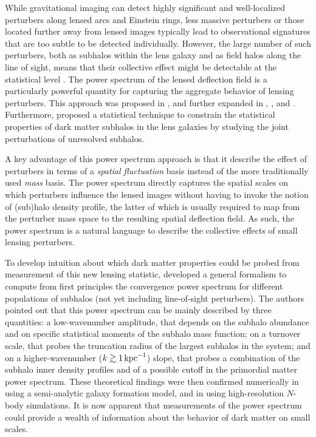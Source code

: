 \documentclass[modern,linenumbers]{aastex62}
\begin{document}
While gravitational imaging can detect highly significant and well-localized perturbers along lensed arcs and Einstein rings, less massive perturbers or those located further away from lensed images typically lead to observational signatures that are too subtle to be detected individually. However, the large number of such perturbers, both as subhalos within the lens galaxy and as field halos along the line of sight, means that their collective effect might be detectable at the statistical level \citep[\eg,][]{Birrer2017}. The power spectrum of the lensed deflection field is a particularly powerful quantity for capturing the aggregate behavior of lensing perturbers. This approach was proposed in \cite{Hezaveh_2014}, and further expanded in \cite{Rivero:2017mao}, \cite{Chatterjee_2017}, and \cite{Cyr-Racine:2018htu}. 
Furthermore, \cite{Daylan:2017kfh} proposed a statistical technique to constrain the statistical properties of dark matter subhalos in the lens galaxies by studying the joint perturbations of unresolved subhalos.

A key advantage of this power spectrum approach is that it describe the effect of perturbers in terms of a \emph{spatial fluctuation} basis instead of the more traditionally used \emph{mass} basis. The power spectrum directly captures the spatial scales on which perturbers influence the lensed images without having to invoke the notion of (sub)halo density profile, the latter of which is usually required to map from the perturber mass space to the resulting spatial deflection field. As such, the power spectrum is a natural language to describe the collective effects of small lensing perturbers. 

To develop intuition about which dark matter properties could be probed from measurement of this new lensing statistic, \cite{Rivero:2017mao} developed a general formalism to compute from first principles the convergence power spectrum for different populations of subhalos (not yet including line-of-sight perturbers). The authors pointed out that this power spectrum can be mainly described by three quantities: a low-wavenumber amplitude, that depends on the subhalo abundance and on specific statistical moments of the subhalo mass function; on a turnover scale, that probes the truncation radius of the largest subhalos in the system; and on a higher-wavenumber ($k\gtrsim 1 \mathrm{\,kpc}^{-1}$) slope, that probes a combination of the subhalo inner density profiles and of a possible cutoff in the primordial matter power spectrum. These theoretical findings were then confirmed numerically in \cite{Brennan:2018jhq} using a semi-analytic galaxy formation model, and in \cite{Rivero:2018bcd} using high-resolution $N$-body simulations. It is now apparent that measurements of the power spectrum could provide a wealth of information about the behavior of dark matter on small scales.
\end{document}
